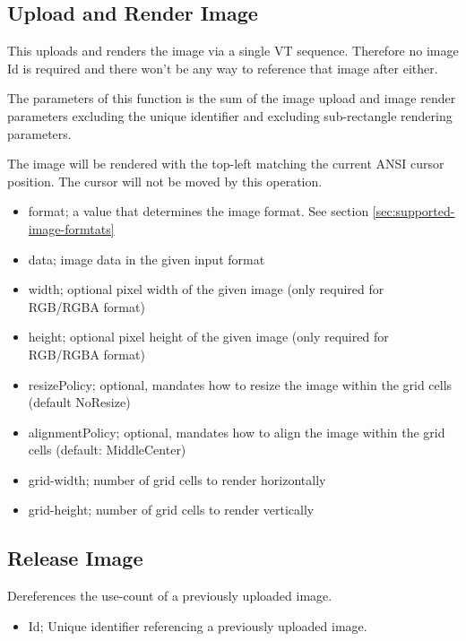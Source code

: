 \documentclass{article}
\begin{document}
\subsection{Upload and Render Image}

This uploads and renders the image via a single VT sequence. Therefore no image Id
is required and there won't be any way to reference that image after either.

The parameters of this function is the sum of the image upload and image render parameters excluding the unique
identifier and excluding sub-rectangle rendering parameters.

The image will be rendered with the top-left matching the current ANSI cursor position.
The cursor will not be moved by this operation.

\begin{itemize}
    \item format; a value that determines the image format. See section \ref{sec:supported-image-formtats}
    \item data; image data in the given input format
    \item width; optional pixel width of the given image (only required for RGB/RGBA format)
    \item height; optional pixel height of the given image (only required for RGB/RGBA format)
    \item resizePolicy; optional, mandates how to resize the image within the grid cells (default NoResize)
    \item alignmentPolicy; optional, mandates how to align the image within the grid cells (default: MiddleCenter)
    \item grid-width; number of grid cells to render horizontally
    \item grid-height; number of grid cells to render vertically
\end{itemize}


\subsection{Release Image}

Dereferences the use-count of a previously uploaded image.

\begin{itemize}
    \item Id; Unique identifier referencing a previously uploaded image.
\end{itemize}
\end{document}
